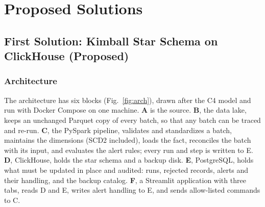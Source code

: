 \documentclass[peerreview]{IEEEtran}
\begin{document}
\section{Proposed Solutions}
\label{sec:solutions}

\subsection{First Solution: Kimball Star Schema on ClickHouse (Proposed)}
\label{sec:sol-kimball}

\subsubsection{Architecture}
The architecture has six blocks (Fig.~\ref{fig:arch}), drawn after the C4 model
\cite{c4model} and run with Docker Compose on one machine. \textbf{A} is the source.
\textbf{B}, the data lake, keeps an unchanged Parquet copy of every batch, so that any batch can
be traced and re-run. \textbf{C}, the PySpark pipeline, validates and standardizes a batch,
maintains the dimensions (SCD2 included), loads the fact, reconciles the batch with its input,
and evaluates the alert rules; every run and step is written to E. \textbf{D}, ClickHouse,
holds the star schema and a backup disk. \textbf{E}, PostgreSQL, holds what must be updated in
place and audited: runs, rejected records, alerts and their handling, and the backup catalog.
\textbf{F}, a Streamlit application with three tabs, reads D and E, writes alert handling to E,
and sends allow-listed commands to C.
\end{document}
